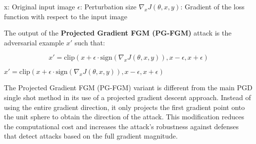x: Original input image  
$\epsilon$: Perturbation size  
$\nabla_x J(\theta, x, y)$: Gradient of the loss function with respect to the input image  


The output of the \textbf{Projected Gradient FGM (PG-FGM)} attack is the adversarial example $x'$ such that:

\[
x' = \text{clip}(x + \epsilon \cdot \text{sign}(\nabla_x J(\theta, x, y)), x - \epsilon, x + \epsilon)
\]

$ x' = \text{clip}(x + \epsilon \cdot \text{sign}(\nabla_x J(\theta, x, y)), x - \epsilon, x + \epsilon)$

The Projected Gradient FGM (PG-FGM) variant is different from the main PGD single shot method in its use of a projected gradient descent approach. Instead of using the entire gradient direction, it only projects the first gradient point onto the unit sphere to obtain the direction of the attack. This modification reduces the computational cost and increases the attack's robustness against defenses that detect attacks based on the full gradient magnitude.